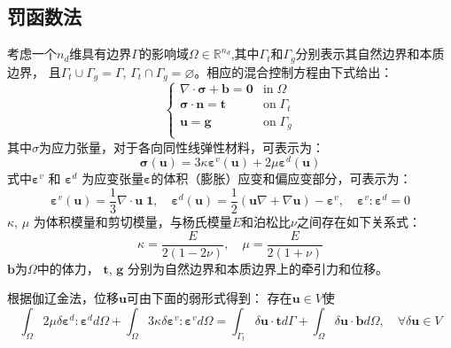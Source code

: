 \subsection{罚函数法}
考虑一个$n_d$维具有边界$\Gamma$的影响域$\Omega\in \mathbb R^{n_d}$,其中$\Gamma_t$和$\Gamma_g$分别表示其自然边界和本质边界，
且$\Gamma_t \cup \Gamma_g = \Gamma$, $\Gamma_t \cap \Gamma_g = \varnothing$。相应的混合控制方程由下式给出：
\begin{equation}\label{strong_penalty}
    \begin{cases}
        \nabla \cdot \boldsymbol \sigma + \boldsymbol b = \boldsymbol 0 & \mathrm{in} \; \Omega \\
        \boldsymbol \sigma \cdot \boldsymbol n = \boldsymbol t & \mathrm{on} \; \Gamma_t \\
        \boldsymbol u = \boldsymbol g & \mathrm{on} \; \Gamma_g \\
\end{cases}
\end{equation}
其中$\sigma$为应力张量，对于各向同性线弹性材料，可表示为：
\begin{equation}\label{stress_penalty}
    \boldsymbol \sigma(\boldsymbol u) = 3\kappa \boldsymbol \varepsilon^v(\boldsymbol u) + 2\mu \boldsymbol \varepsilon^d(\boldsymbol u) 
\end{equation}
式中$\boldsymbol \varepsilon^v$ 和 $\boldsymbol \varepsilon^d$ 为应变张量$\boldsymbol \varepsilon$的体积（膨胀）应变和偏应变部分，可表示为：
\begin{equation}
    \boldsymbol \varepsilon^v(\boldsymbol u) =\frac{1}{3} \nabla \cdot \boldsymbol u \; \boldsymbol 1, \quad
    \boldsymbol \varepsilon^d(\boldsymbol u) =\frac{1}{2}(\boldsymbol u \nabla + \nabla \boldsymbol u) - \boldsymbol \varepsilon^v, \quad
    \boldsymbol \varepsilon^v : \boldsymbol \varepsilon^d = 0
\end{equation}
$\kappa$, $\mu$ 为体积模量和剪切模量，与杨氏模量$E$和泊松比$\nu$之间存在如下关系式：
\begin{equation}\label{modulus}
    \kappa = \frac{E}{2(1-2\nu)}, \quad \mu = \frac{E}{2(1+\nu)}
\end{equation}
$\boldsymbol b$为$\Omega$中的体力， $\boldsymbol t$, $\boldsymbol g$ 分别为自然边界和本质边界上的牵引力和位移。

根据伽辽金法，位移$\boldsymbol u$可由下面的弱形式得到：
存在$\boldsymbol u \in V$使
\begin{equation}\label{weak_penalty}
\int_\Omega 2\mu \delta \boldsymbol \varepsilon^d : \boldsymbol \varepsilon^d d\Omega +
\int_\Omega 3\kappa \delta \boldsymbol \varepsilon^v : \boldsymbol \varepsilon^v d\Omega =
\int_{\Gamma_t} \delta \boldsymbol u \cdot \boldsymbol t d\Gamma + \int_\Omega \delta \boldsymbol u \cdot \boldsymbol b d\Omega, \quad
\forall \delta \boldsymbol u \in V
\end{equation}

